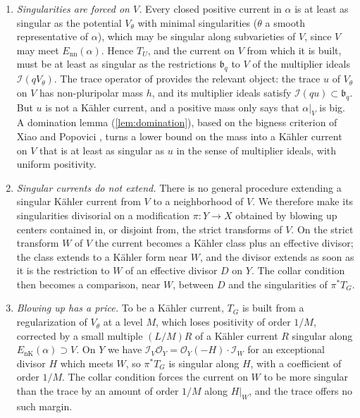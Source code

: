 \documentclass[11pt,a4paper]{amsart}
\newcommand{\EnK}{E_{\mathrm{nK}}}
\newcommand{\Enn}{E_{\mathrm{nn}}}
\theoremstyle{definition}
\begin{document}
\begin{enumerate}[label=(\arabic*),leftmargin=*,itemsep=.2em,topsep=.3em]
\item \emph{Singularities are forced on $V$.} Every closed positive
  current in $\alpha$ is at least as singular as the potential $V_\theta$ with minimal
  singularities ($\theta$ a smooth representative of $\alpha$), which may be singular along subvarieties of $V$, since
  $V$ may meet $\Enn(\alpha)$. Hence $T_U$, and the current on $V$ from
  which it is built, must be at least as singular as the restrictions
  $\mathfrak b_q$ to $V$ of the multiplier ideals $\mathcal I(qV_\theta)$.
  The trace operator of \cite{DX24} provides the relevant object: the
  trace $u$ of $V_\theta$ on $V$ has non-pluripolar mass $h$, and its
  multiplier ideals satisfy $\mathcal I(qu)\subset\mathfrak b_q$. But
  $u$ is not a K\"ahler current, and a positive mass only says that
  $\alpha|_V$ is big. A domination lemma (\cref{lem:domination}),
  based on the bigness criterion of Xiao and Popovici
  \cite{Xiao15,Pop16}, turns a lower bound on the mass into a K\"ahler
  current on $V$ that is at least as singular as $u$ in the sense of
  multiplier ideals, with uniform positivity.
\item \emph{Singular currents do not extend.} There is no general
  procedure extending a singular K\"ahler current from $V$ to a
  neighborhood of $V$. We therefore make its singularities divisorial on a
  modification $\pi\colon Y\to X$ obtained by blowing up centers contained
  in, or disjoint from, the strict transforms of $V$. On the strict transform $W$ of $V$ the current
  becomes a K\"ahler class plus an effective divisor; the class extends to a
  K\"ahler form near $W$, and the divisor extends as soon as it is the
  restriction to $W$ of an effective divisor $D$ on $Y$. The collar
  condition then becomes a comparison, near $W$, between $D$ and the
  singularities of $\pi^*T_G$.
\item \emph{Blowing up has a price.} To be a K\"ahler current, $T_G$ is
  built from a regularization of $V_\theta$ at a level $M$, which loses
  positivity of order $1/M$, corrected by a small multiple $(L/M)R$ of a
  K\"ahler current $R$ singular along $\EnK(\alpha)\supset V$. On $Y$ we
  have $\mathcal I_V\mathcal O_Y=\mathcal O_Y(-H)\cdot\mathcal I_W$ for an
  exceptional divisor $H$ which meets $W$, so $\pi^*T_G$ is singular along
  $H$, with a coefficient of order $1/M$. The collar condition forces the
  current on $W$ to be more singular than the trace by an amount of order
  $1/M$ along $H|_W$, and the trace offers no such margin.
\end{enumerate}
\end{document}
